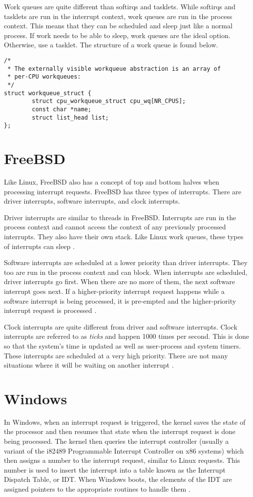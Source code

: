 \documentclass[10pt,draftclsnofoot,onecolumn,journal,compsoc]{IEEEtran}
\begin{document}
Work queues are quite different than softirqs and tasklets. While softirqs and tasklets are run in the interrupt context, work queues are run in the process context. This means that they can be scheduled and sleep just like a normal process. If work needs to be able to sleep, work queues are the ideal option. Otherwise, use a tasklet. The structure of a work queue is found below.

\begin{lstlisting}[caption={The \textit{workqueue\_struct} structure in the linux/workqueue.h file.}]
/*
 * The externally visible workqueue abstraction is an array of
 * per-CPU workqueues:
 */
struct workqueue_struct {
        struct cpu_workqueue_struct cpu_wq[NR_CPUS];
        const char *name;
        struct list_head list;
};
\end{lstlisting}

\section{FreeBSD}
Like Linux, FreeBSD also has a concept of top and bottom halves when processing interrupt requests. FreeBSD has three types of interrupts. There are driver interrupts, software interrupts, and clock interrupts. 

Driver interrupts are similar to threads in FreeBSD. Interrupts are run in the process context and cannot access the context of any previously processed interrupts. They also have their own stack. Like Linux work queues, these types of interrupts can sleep \cite{bsd}. 

Software interrupts are scheduled at a lower priority than driver interrupts. They too are run in the process context and can block. When interrupts are scheduled, driver interrupts go first. When there are no more of them, the next software interrupt goes next. If a higher-priority interrupt request happens while a software interrupt is being processed, it is pre-empted and the higher-priority interrupt request is processed \cite{bsd}.

Clock interrupts are quite different from driver and software interrupts. Clock interrupts are referred to as \textit{ticks} and happen 1000 times per second. This is done so that the system's time is updated as well as user-process and system timers. These interrupts are scheduled at a very high priority. There are not many situations where it will be waiting on another interrupt \cite{bsd}.  

\section{Windows}
In Windows, when an interrupt request is triggered, the kernel saves the state of the processor and then resumes that state when the interrupt request is done being processed. The kernel then queries the interrupt controller (usually a variant of the i82489 Programmable Interrupt Controller on x86 systems) which then assigns a number to the interrupt request, similar to Linux requests. This number is used to insert the interrupt into a table known as the Interrupt Dispatch Table, or IDT. When Windows boots, the elements of the IDT are assigned pointers to the appropriate routines to handle them \cite{win}. 
\end{document}
